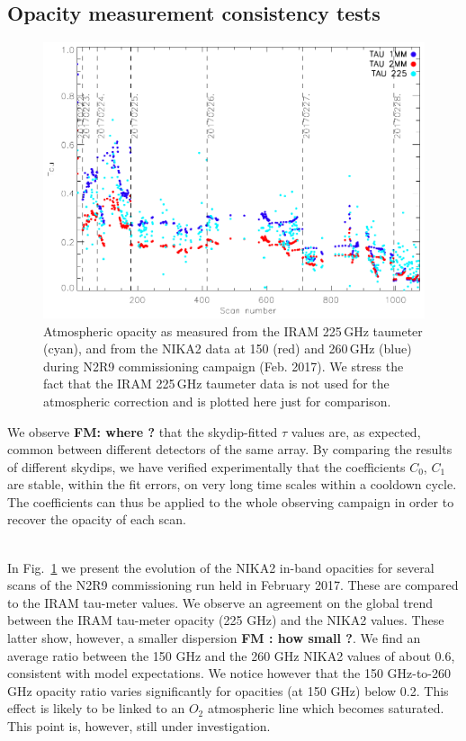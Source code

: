 \subsection{Opacity measurement consistency tests}


\begin{figure}
\includegraphics[scale=0.75]{../../Paper_NIKA2_Technical/opacity_evol_run22.pdf}
\caption{Atmospheric opacity as measured from the IRAM 225\,GHz taumeter (cyan), and from the NIKA2 data at 150 (red) and 260\,GHz (blue) during 
  N2R9 commissioning campaign (Feb. 2017). We stress the fact that the IRAM 225\,GHz taumeter data is not used for the atmospheric correction and is plotted here just for comparison.
  \label{fig:taumeas}}
\end{figure}

We observe {\bf FM: where ?} that the skydip-fitted $\tau$ values are, as expected,
common between different detectors of the same array. By comparing
the results of different skydips, we have verified experimentally
that the coefficients $C_0$, $C_1$ are stable, within the fit
errors, on very long time scales within a cooldown cycle. The
coefficients can thus be applied to the whole observing campaign
in order to recover the opacity of each scan.


\\


In Fig.~\ref{fig:taumeas} we present the evolution of the NIKA2 in-band opacities for several
scans of the N2R9 commissioning run held in February 2017. These are
compared to the IRAM tau-meter values. We observe an agreement on the global trend between the IRAM tau-meter opacity
(225 GHz) and the NIKA2 values. These latter show, however,
a smaller dispersion {\bf FM : how small ?}. We find an average ratio between the
150 GHz and the 260 GHz NIKA2 values of about
0.6, consistent with model expectations. We notice however that
the 150 GHz-to-260 GHz opacity ratio varies significantly for
opacities (at 150 GHz) below 0.2. This effect is likely to be
linked to an $O_2$ atmospheric line which becomes saturated. This
point is, however, still under investigation.

